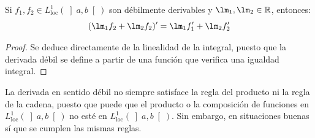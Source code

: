 \begin{prop}
    Si $f_1,f_2\in L^1_\text{loc}(\left]a,b\right[)$ son débilmente derivables y $\lm_1,\lm_2\in \mathbb{R}$, entonces:
    \begin{equation*}
        (\lm_1f_2 + \lm_2f_2)' = \lm_1f_1' + \lm_2f_2'
    \end{equation*}
    \begin{proof}
        Se deduce directamente de la linealidad de la integral, puesto que la derivada débil se define a partir de una función que verifica una igualdad integral.
    \end{proof}
\end{prop}

\begin{observacion}
    La derivada en sentido débil no siempre satisface la regla del producto ni la regla de la cadena, puesto que puede que el producto o la composición de funciones en $L^1_\text{loc}(\left]a,b\right[)$ no esté en $L^1_\text{loc}(\left]a,b\right[)$. Sin embargo, en situaciones buenas sí que se cumplen las mismas reglas.
\end{observacion}

